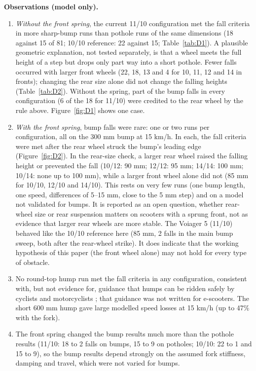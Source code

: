 \textbf{Observations (model only).}
\begin{enumerate}
\item \emph{Without the front spring}, the current 11/10 configuration met the fall criteria
  in more sharp-bump runs than pothole runs of the same dimensions (18 against 15 of 81;
  10/10 reference: 22 against 15; Table~\ref{tab:D1}). A plausible geometric explanation,
  not tested separately, is that a wheel meets the full height of a step but drops only part
  way into a short pothole. Fewer falls occurred with larger front wheels (22, 18, 13 and 4
  for 10, 11, 12 and 14 in fronts); changing the rear size alone did not change the falling
  heights (Table~\ref{tab:D2}). Without the spring, part of the bump falls in every
  configuration (6 of the 18 for 11/10) were credited to the rear wheel by the rule above.
  Figure~\ref{fig:D1} shows one case.
\item \emph{With the front spring}, bump falls were rare: one or two runs per configuration,
  all on the 300 mm bump at 15 km/h. In each, the fall criteria were met after the rear
  wheel struck the bump's leading edge (Figure~\ref{fig:D2}). In the rear-size check, a
  larger rear wheel raised the falling height or prevented the fall (10/12: 90 mm; 12/12:
  95 mm; 14/14: 100 mm; 10/14: none up to 100 mm), while a larger front wheel alone did
  not (85 mm for 10/10, 12/10 and 14/10). This rests on very few runs (one bump length, one
  speed, differences of 5--15 mm, close to the 5 mm step) and on a model not validated
  for bumps. It is reported as an open question, whether rear-wheel size or rear
  suspension matters on scooters with a sprung front, not as evidence that larger rear
  wheels are more stable. The Voiager 5 (11/10) behaved like the 10/10 reference here
  (85 mm, 2 falls in the main bump sweep, both after the rear-wheel strike). It does
  indicate that the working hypothesis of this paper (the front wheel alone) may not hold
  for every type of obstacle.
\item No round-top hump run met the fall criteria in any configuration, consistent with,
  but not evidence for, guidance that humps can be ridden safely by cyclists and
  motorcyclists \autocite{tal7_96}; that guidance was not written for e-scooters. The
  short 600 mm hump gave large modelled speed losses at 15 km/h (up to 47\% with the
  fork).
\item The front spring changed the bump results much more than the pothole results (11/10:
  18 to 2 falls on bumps, 15 to 9 on potholes; 10/10: 22 to 1 and 15 to 9), so the bump results depend strongly on
  the assumed fork stiffness, damping and travel, which were not varied for bumps.
\end{enumerate}

